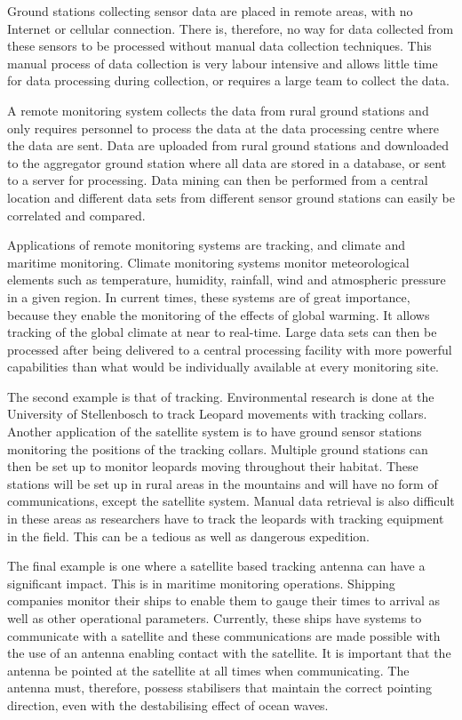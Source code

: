Ground stations collecting sensor data are placed in remote areas, with no Internet or cellular connection.
There is, therefore, no way for data collected from these sensors to be processed without manual data collection
techniques. This manual process of data collection is very labour intensive and allows little time for data processing
during collection, or requires a large team to collect the data.

A remote monitoring system collects the data from rural ground stations and only requires personnel to process the
data at the data processing centre where the data are sent. Data are uploaded from rural ground stations and downloaded
to the aggregator ground station where all data are stored in a database, or sent to a server for processing. Data mining
can then be performed from a central location and different data sets from different sensor ground stations can easily
be correlated and compared.

Applications of remote monitoring systems are tracking, and climate and maritime monitoring. Climate monitoring
systems monitor meteorological elements such as temperature, humidity, rainfall, wind and atmospheric pressure
in a given region. In current times, these systems are of  great importance, because they enable the monitoring
of the effects of global warming. It allows tracking of the global climate at near to real-time. Large data sets can
then be processed after being delivered to a central processing facility with more powerful capabilities than what
would be individually available at every monitoring site.

The second example is that of tracking. Environmental research is done at the University of Stellenbosch
to track Leopard movements with tracking collars. Another application of the satellite system is to
have ground sensor stations monitoring the positions of the tracking collars. Multiple ground stations
can then be set up to monitor leopards moving throughout their habitat. These stations will be set up
in rural areas in the mountains and will have no form of communications, except the satellite system.
Manual data retrieval is also difficult in these areas as researchers have to track the leopards with
tracking equipment in the field. This can be a tedious as well as dangerous expedition.

The final example is one where a satellite based tracking antenna can have a significant impact. This
is in maritime monitoring operations. Shipping companies monitor their ships to enable them to gauge their times
to arrival as well as other operational parameters. Currently, these ships have systems to communicate
with a satellite and these communications are made possible with the use of an antenna enabling contact
with the satellite. It is important that the antenna be pointed at the satellite at all times when communicating.
The antenna must, therefore, possess stabilisers that maintain the correct pointing direction, even with
the destabilising effect of ocean waves.

